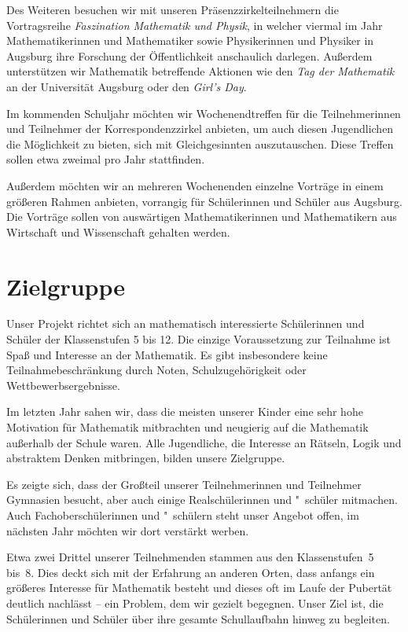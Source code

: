 \documentclass[12pt]{zettel}
\begin{document}
Des Weiteren besuchen wir mit unseren Präsenzzirkelteilnehmern die
Vortragsreihe \emph{Faszination Mathematik und Physik}, in welcher viermal im
Jahr Mathematikerinnen und Mathematiker sowie Physikerinnen und Physiker in Augsburg ihre Forschung der
Öffentlichkeit anschaulich darlegen. Außerdem unterstützen wir
Mathematik betreffende Aktionen wie den \emph{Tag der Mathematik} an
der Universität Augsburg oder den \emph{Girl's Day}.

Im kommenden Schuljahr möchten wir Wochenendtreffen für die Teilnehmerinnen und
Teilnehmer der Korrespondenzzirkel anbieten, um auch diesen Jugendlichen die
Möglichkeit zu bieten, sich mit Gleichgesinnten auszutauschen. Diese Treffen
sollen etwa zweimal pro Jahr stattfinden.

Außerdem möchten wir an mehreren Wochenenden einzelne Vorträge in einem
größeren Rahmen anbieten, vorrangig für Schülerinnen und Schüler aus Augsburg.
Die Vorträge sollen von auswärtigen Mathematikerinnen und Mathematikern aus
Wirtschaft und Wissenschaft gehalten werden.


\section{Zielgruppe}

Unser Projekt richtet sich an mathematisch interessierte Schülerinnen
und Schüler der Klassenstufen 5 bis 12. Die einzige Voraussetzung zur
Teilnahme ist Spaß und Interesse an der Mathematik. Es gibt insbesondere
keine Teilnahmebeschränkung durch Noten, Schulzugehörigkeit oder
Wettbewerbsergebnisse.

Im letzten Jahr sahen wir, dass die meisten unserer Kinder eine
sehr hohe Motivation für Mathematik mitbrachten und neugierig auf die
Mathematik außerhalb der Schule waren. Alle Jugendliche, die Interesse an
Rätseln, Logik und abstraktem Denken mitbringen, bilden unsere
Zielgruppe.

Es zeigte sich, dass der Großteil unserer Teilnehmerinnen und
Teilnehmer Gymnasien besucht, aber auch einige Realschülerinnen und "~schüler mitmachen.
Auch Fachoberschülerinnen und "~schülern steht unser Angebot offen, im nächsten
Jahr möchten wir dort verstärkt werben.

Etwa zwei Drittel unserer Teilnehmenden
stammen aus den Klassenstufen~5 bis~8.
Dies deckt sich mit der
Erfahrung an anderen Orten, dass anfangs ein größeres Interesse für
Mathematik besteht und dieses oft im Laufe der Pubertät
deutlich nachlässt -- ein Problem, dem wir gezielt begegnen. Unser Ziel ist, die Schülerinnen und Schüler über ihre gesamte Schullaufbahn hinweg zu begleiten.
\end{document}
